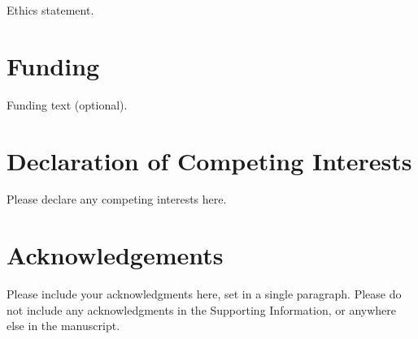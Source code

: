 \documentclass[]{imag-ms-template}
\theoremstyle{plain}
\theoremstyle{remark}
\begin{document}
Ethics statement.

\section*{Funding}

Funding text (optional).

\section*{Declaration of Competing Interests}

Please declare any competing interests here.

\section*{Acknowledgements}

Please include your acknowledgments here, set in a single paragraph.
Please do not include any acknowledgments in the Supporting Information,
or anywhere else in the manuscript.

\printbibliography
\end{document}
